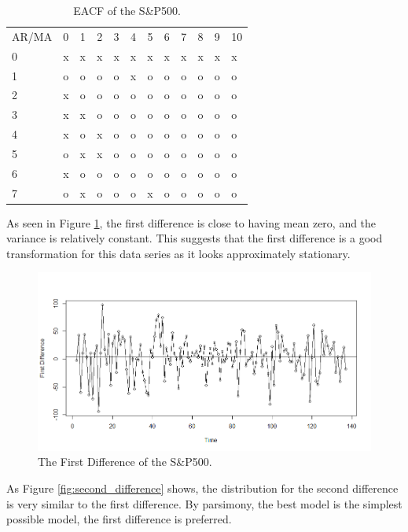 \documentclass[12pt, centerh1]{article}
\begin{document}
\begin{table}[H]
\centering
\begin{tabular}{lcccccccccll}
AR/MA & 0 & 1 & 2 & 3 & 4 & 5 & 6 & 7 & 8 & 9 & 10 \\
0     & x & x & x & x & x & x & x & x & x & x & x  \\
1     & o & o & o & o & x & o & o & o & o & o & o  \\
2     & x & o & o & o & o & o & o & o & o & o & o  \\
3     & x & x & o & o & o & o & o & o & o & o & o  \\
4     & x & o & x & o & o & o & o & o & o & o & o  \\
5     & o & x & x & o & o & o & o & o & o & o & o  \\
6     & x & o & o & o & o & o & o & o & o & o & o  \\
7     & o & x & o & o & o & x & o & o & o & o & o 
\end{tabular}
\caption{EACF of the S\&P500.}
\label{table:coefficients}
\end{table}
As seen in Figure \ref{fig:first_difference}, the first difference is close to having mean zero, and the variance is relatively constant. This suggests that the first difference is a good transformation for this data series as it looks approximately stationary. 
\begin{figure}[H]
    \centering
    \includegraphics[scale=0.5]{imgs/first_difference.png}
    \caption{The First Difference of the S\&P500.}
    \label{fig:first_difference}
\end{figure}
As Figure \ref{fig:second_difference} shows, the distribution for the second difference is very similar to the first difference. By parsimony, the best model is the simplest possible model, the first difference is preferred.
\end{document}
